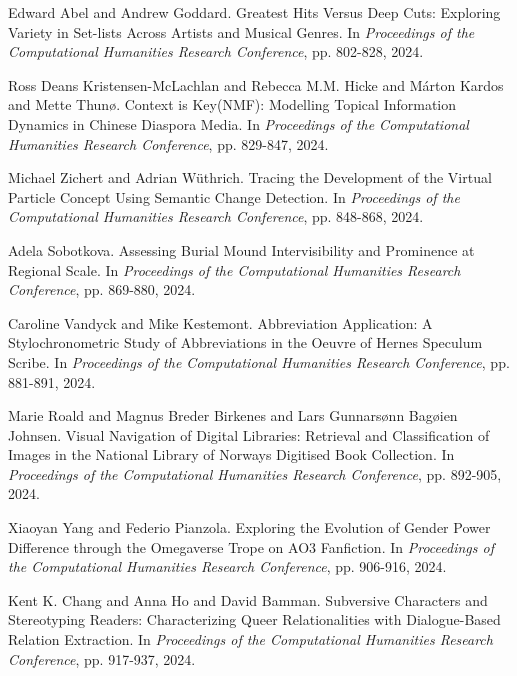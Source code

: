 \begin{thebibliography}{99}
 Edward Abel and Andrew Goddard. {G}reatest {H}its {V}ersus {D}eep {C}uts: {E}xploring {V}ariety in {S}et-lists {A}cross {A}rtists and {M}usical {G}enres. In \textit{Proceedings of the Computational Humanities Research Conference}, pp. 802-828, 2024.

 Ross Deans Kristensen-McLachlan and Rebecca M.M. Hicke and M{\'a}rton Kardos and Mette Thun{\o}. {C}ontext is {K}ey({N}MF): {M}odelling {T}opical {I}nformation {D}ynamics in {C}hinese {D}iaspora {M}edia. In \textit{Proceedings of the Computational Humanities Research Conference}, pp. 829-847, 2024.

 Michael Zichert and Adrian W{\"u}thrich. {T}racing the {D}evelopment of the {V}irtual {P}article {C}oncept {U}sing {S}emantic {C}hange {D}etection. In \textit{Proceedings of the Computational Humanities Research Conference}, pp. 848-868, 2024.

 Adela Sobotkova. {A}ssessing {B}urial {M}ound {I}ntervisibility and {P}rominence at {R}egional {S}cale. In \textit{Proceedings of the Computational Humanities Research Conference}, pp. 869-880, 2024.

 Caroline Vandyck and Mike Kestemont. {A}bbreviation {A}pplication: {A} Stylochronometric {S}tudy of {A}bbreviations in the {O}euvre of {H}erne\textquotesingle s {S}peculum {S}cribe. In \textit{Proceedings of the Computational Humanities Research Conference}, pp. 881-891, 2024.

 Marie Roald and Magnus Breder Birkenes and Lars Gunnars{\o}nn Bag{\o}ien Johnsen. {V}isual {N}avigation of {D}igital {L}ibraries: {R}etrieval and {C}lassification of {I}mages in the {N}ational {L}ibrary of {N}orway\textquotesingle s {D}igitised {B}ook {C}ollection. In \textit{Proceedings of the Computational Humanities Research Conference}, pp. 892-905, 2024.

 Xiaoyan Yang and Federio Pianzola. {E}xploring the {E}volution of {G}ender {P}ower {D}ifference through the {O}megaverse {T}rope on {A}O3 {F}anfiction. In \textit{Proceedings of the Computational Humanities Research Conference}, pp. 906-916, 2024.

 Kent K. Chang and Anna Ho and David Bamman. {S}ubversive {C}haracters and {S}tereotyping {R}eaders: {C}haracterizing {Q}ueer {R}elationalities with {D}ialogue-{B}ased {R}elation {E}xtraction. In \textit{Proceedings of the Computational Humanities Research Conference}, pp. 917-937, 2024.


\end{thebibliography}
